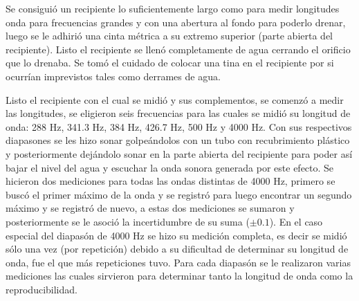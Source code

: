 \documentclass[10pt,a4paper]{article}
\begin{document}
Se consiguió un recipiente lo suficientemente largo como para medir longitudes onda para frecuencias grandes y con una abertura al fondo para poderlo drenar, luego se le adhirió una cinta métrica a su extremo superior  (parte abierta del recipiente). Listo el recipiente se llenó completamente de agua cerrando el orificio que lo drenaba. Se tomó el cuidado de colocar una tina en el recipiente por si ocurrían imprevistos tales como derrames de agua.

Listo el recipiente con el cual se midió y sus complementos, se comenzó a medir las longitudes, se eligieron seis frecuencias para las cuales se midió su longitud de onda: 288 Hz, 341.3 Hz, 384 Hz, 426.7 Hz, 500 Hz y 4000 Hz. Con sus respectivos diapasones se les hizo sonar golpeándolos con un tubo con recubrimiento plástico y posteriormente dejándolo sonar en la parte abierta del recipiente para poder así bajar el nivel del agua y escuchar la onda sonora generada por este efecto. Se hicieron dos mediciones para todas las ondas distintas de 4000 Hz, primero se buscó el primer máximo de la onda y se registró para luego encontrar un segundo máximo y se registró de nuevo, a estas dos mediciones se sumaron y posteriormente se le asoció la incertidumbre de su suma ($\pm0.1$). En el caso especial del diapasón de 4000 Hz se hizo su medición completa, es decir se midió sólo una vez (por repetición) debido a su dificultad de determinar su longitud de onda, fue el que más repeticiones tuvo. Para cada diapasón se le realizaron varias mediciones las cuales sirvieron para determinar tanto la longitud de onda como la reproducibilidad.
\end{document}

